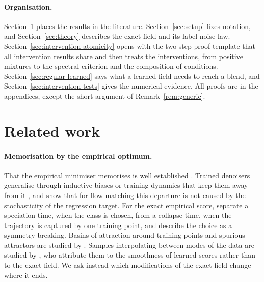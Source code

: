 \documentclass{article} %
\theoremstyle{plain}
\theoremstyle{definition}
\theoremstyle{remark}
\begin{document}
\paragraph{Organisation.} Section~\ref{sec:related} places the results in the literature.
Section~\ref{sec:setup} fixes notation, and Section~\ref{sec:theory} describes the exact field and
its label-noise law. Section~\ref{sec:intervention-atomicity} opens with the two-step proof template
that all intervention results share and then treats the interventions, from
positive mixtures to the spectral criterion and the composition of conditions.
Section~\ref{sec:regular-learned} says what a learned field needs to reach a blend, and
Section~\ref{sec:intervention-tests} gives the numerical evidence. All proofs are in the
appendices, except the short argument of Remark~\ref{rem:generic}.

\section{Related work}
\label{sec:related}

\paragraph{Memorisation by the empirical optimum.} That the empirical minimiser memorises is well
established
\citep{pidstrigach2022manifolds,gu2023memorization,biroli2023diffusion,buchanan2025edge,gao2024flow,bertrand2025closed,li2026memory}.
Trained denoisers generalise through inductive biases or training dynamics that keep them away
from it \citep{kadkhodaie2024generalization,kamb2024creativity,niedoba2024mechanistic,bonnaire2025why,vastola2025generalization},
and \citet{bertrand2025closed} show that for flow matching this departure is not caused by the
stochasticity of the regression target. For the exact empirical score, \citet{biroli2024dynamical}
separate a speciation time, when the class is chosen, from a collapse time, when the trajectory is
captured by one training point, and \citet{raya2023ssb} describe the choice as a symmetry
breaking. Basins of attraction around training points and spurious attractors are studied by
\citet{pham2025memorization}. Samples interpolating between modes of the data are studied by
\citet{aithal2024hallucinations}, who attribute them to the smoothness of learned scores rather
than to the exact field. We ask instead which modifications of the exact field change where it
ends.
\end{document}
